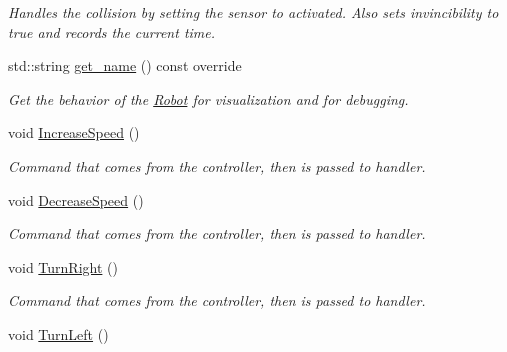 \begin{DoxyCompactItemize}
\begin{DoxyCompactList}\small\item\em Handles the collision by setting the sensor to activated. Also sets invincibility to true and records the current time. \end{DoxyCompactList}\item 
std\+::string \hyperlink{classRobot_a3f77c13705b8f60480d21d8d936dc39e}{get\+\_\+name} () const override\hypertarget{classRobot_a3f77c13705b8f60480d21d8d936dc39e}{}\label{classRobot_a3f77c13705b8f60480d21d8d936dc39e}

\begin{DoxyCompactList}\small\item\em Get the behavior of the \hyperlink{classRobot}{Robot} for visualization and for debugging. \end{DoxyCompactList}\item 
void \hyperlink{classRobot_ae4647cccd002ca13659017e634237ead}{Increase\+Speed} ()\hypertarget{classRobot_ae4647cccd002ca13659017e634237ead}{}\label{classRobot_ae4647cccd002ca13659017e634237ead}

\begin{DoxyCompactList}\small\item\em Command that comes from the controller, then is passed to handler. \end{DoxyCompactList}\item 
void \hyperlink{classRobot_a94afa6f63eb22667261c07933faae481}{Decrease\+Speed} ()\hypertarget{classRobot_a94afa6f63eb22667261c07933faae481}{}\label{classRobot_a94afa6f63eb22667261c07933faae481}

\begin{DoxyCompactList}\small\item\em Command that comes from the controller, then is passed to handler. \end{DoxyCompactList}\item 
void \hyperlink{classRobot_a12b5883779f682c66e71bc54b6539694}{Turn\+Right} ()\hypertarget{classRobot_a12b5883779f682c66e71bc54b6539694}{}\label{classRobot_a12b5883779f682c66e71bc54b6539694}

\begin{DoxyCompactList}\small\item\em Command that comes from the controller, then is passed to handler. \end{DoxyCompactList}\item 
void \hyperlink{classRobot_ad864d21d997dbadf55f997c2f0143d41}{Turn\+Left} ()\hypertarget{classRobot_ad864d21d997dbadf55f997c2f0143d41}{}\label{classRobot_ad864d21d997dbadf55f997c2f0143d41}


\end{DoxyCompactItemize}
